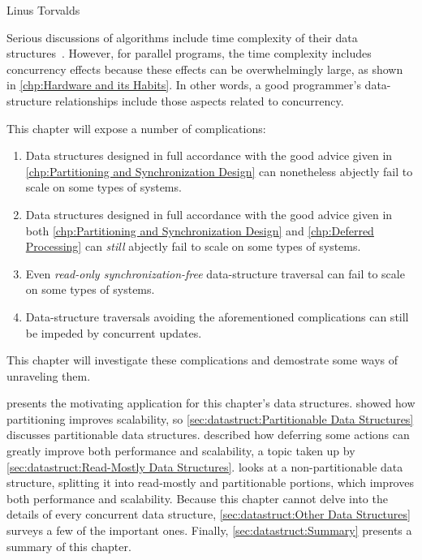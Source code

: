 
%
	 {Linus Torvalds}

Serious discussions of algorithms include time complexity of their
data structures~\cite{ThomasHCorman2001Algorithms}.
However, for parallel programs, the time complexity includes concurrency
effects because these effects can be overwhelmingly large, as shown in
\cref{chp:Hardware and its Habits}.
In other words, a good programmer's data-structure relationships
include those aspects related to concurrency.

This chapter will expose a number of complications:

\begin{enumerate}
\item	Data structures designed in full accordance with the
	good advice given in
	\cref{chp:Partitioning and Synchronization Design}
	can nonetheless abjectly fail to scale on some types of systems.
\label{sec:datastruct:NUMA-induced failure to scale}
\item	Data structures designed in full accordance with the
	good advice given in both
	\cref{chp:Partitioning and Synchronization Design}
	and
	\cref{chp:Deferred Processing}
	can \emph{still} abjectly fail to scale on some types of systems.
\label{sec:datastruct:Cache-size-induced failure to scale}
\item	Even \emph{read-only synchronization-free} data-structure traversal 
	can fail to scale on some types of systems.
\label{sec:datastruct:Cache-size-induced failure to scale redux}
\item	Data-structure traversals avoiding the aforementioned complications
	can still be impeded by concurrent updates.
\label{sec:datastruct:Update-activity failure to scale}
\end{enumerate}

This chapter will investigate these complications and demostrate some
ways of unraveling them.

presents the motivating application for this chapter's data structures.
 showed how
partitioning improves scalability, so
\cref{sec:datastruct:Partitionable Data Structures}
discusses partitionable data structures.
 described how deferring some
actions can greatly improve both performance and scalability,
a topic taken up by
\cref{sec:datastruct:Read-Mostly Data Structures}.
looks at a non-partitionable data structure, splitting
it into read-mostly and partitionable portions,
which improves both performance and scalability.
Because this chapter cannot delve into the details of every concurrent
data structure,
\cref{sec:datastruct:Other Data Structures}
surveys a few of the important ones.
Finally, \cref{sec:datastruct:Summary}
presents a summary of this chapter.

